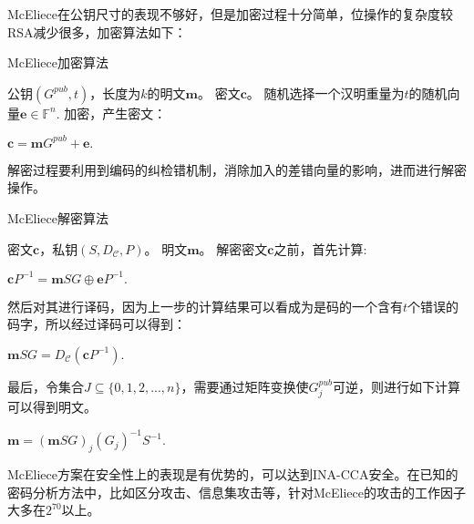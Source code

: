 McEliece在公钥尺寸的表现不够好，但是加密过程十分简单，位操作的复杂度较RSA减少很多，加密算法如下：

\begin{breakablealgorithm}
	\small
	\renewcommand{\algorithmicrequire}{\textbf{Input:}}
	\renewcommand{\algorithmicensure}{\textbf{Output:}}
	\caption{McEliece加密算法}
	\label{alg:McElieceEn}
	\begin{algorithmic}[1]
		\Require
		公钥$(G^{pub},t)$，长度为$k$的明文$\mathbf{m}$。
		\Ensure
		密文$\mathbf{c}$。
		\State
		随机选择一个汉明重量为$t$的随机向量$\mathbf{e} \in \mathbb{F}^n$.
		\State
		加密，产生密文：
		
		\centering $\mathbf{c} = \mathbf{m}G^{pub} + \mathbf{e}.$
	\end{algorithmic}
\end{breakablealgorithm}

解密过程要利用到编码的纠检错机制，消除加入的差错向量的影响，进而进行解密操作。

\begin{breakablealgorithm}
	\small
	\renewcommand{\algorithmicrequire}{\textbf{Input:}}
	\renewcommand{\algorithmicensure}{\textbf{Output:}}
	\caption{McEliece解密算法}
	\label{alg:McElieceDe}
	\begin{algorithmic}[1]
		\Require
		密文$\mathbf{c}$，私钥$(S,D_\mathcal{C},P)$。
		\Ensure
		明文$\mathbf{m}$。
		\State
		解密密文$\mathbf{c}$之前，首先计算:
		\begin{center}
			$\mathbf{c}P^{-1} = \mathbf{m}SG \oplus\textbf{e}P^{-1}.$
		\end{center}

		\State
		然后对其进行译码，因为上一步的计算结果可以看成为是码的一个含有$t$个错误的码字，所以经过译码可以得到：
		\begin{center}
			$\mathbf{m}SG = D_\mathcal{C}(\mathbf{c}P^{-1}).$
		\end{center}
		
		\State
		最后，令集合$J \subseteq \{0,1,2,...,n\}$，需要通过矩阵变换使$G_j^{pub}$可逆，则进行如下计算可以得到明文。
		\begin{center}
			$\mathbf{m} = (\mathbf{m}SG)_j(G_j)^{-1}S^{-1}.$
		\end{center}		
	\end{algorithmic}
\end{breakablealgorithm}

McEliece方案在安全性上的表现是有优势的，可以达到INA-CCA安全。在已知的密码分析方法中，比如区分攻击、信息集攻击等，针对McEliece的攻击的工作因子大多在$2^{70}$以上。


